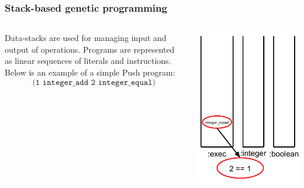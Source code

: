 \documentclass{beamer}
\newcommand{\linespace}{\vskip 0.25cm}
\begin{document}
\begin{frame}
	\frametitle{Stack-based genetic programming}
	\begin{columns}
		\begin{column}{0.65\textwidth}
			Data-stacks are used for managing input and output of operations.
			\linespace
			\linespace
			\linespace
			Programs are represented as linear sequences of literals and instructions. Below is an example of a simple Push program:
			\[\texttt{(1 integer\_add 2 integer\_equal)}\]
		\end{column}
		\begin{column}{0.35\textwidth}
			\includegraphics[height=.7\textheight]{Illustrations/stack_8.PDF}
		\end{column}
	\end{columns}
\end{frame}
\end{document}
